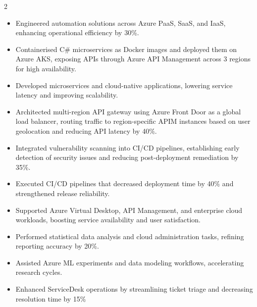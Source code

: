 \documentclass[10pt,a4paper,withhyper]{altacv}
\begin{document}
\begin{paracol}{2}
\begin{justify}
\begin{itemize}
    \item Engineered automation solutions across Azure PaaS, SaaS, and IaaS, enhancing operational efficiency by 30\%.
    \item Containerised C\# microservices as Docker images and deployed them on Azure AKS, exposing APIs through Azure API Management across 3 regions for high availability.
    \item Developed microservices and cloud-native applications, lowering service latency and improving scalability.
    \item Architected multi-region API gateway using Azure Front Door as a global load balancer, routing traffic to region-specific APIM instances based on user geolocation and reducing API latency by 40\%.
    \item Integrated vulnerability scanning into CI/CD pipelines, establishing early detection of security issues and reducing post-deployment remediation by 35\%.
    \item Executed CI/CD pipelines that decreased deployment time by 40\% and strengthened release reliability.
    \item Supported Azure Virtual Desktop, API Management, and enterprise cloud workloads, boosting service availability and user satisfaction.
    
\end{itemize}
\end{justify}
\divider

\begin{justify}
\begin{itemize}

    \item Performed statistical data analysis and cloud administration tasks, refining reporting accuracy by 20\%.
    \item Assisted Azure ML experiments and data modeling workflows, accelerating research cycles.
    \item Enhanced ServiceDesk operations by streamlining ticket triage and decreasing resolution time by 15\%
    
\end{itemize}
\end{justify}

\divider




\end{paracol}
\end{document}
